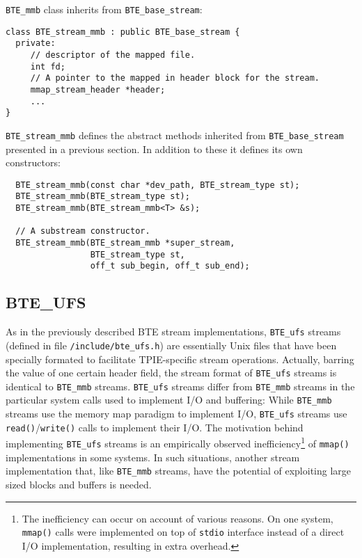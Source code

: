 \verb|BTE_mmb| class inherits from \verb|BTE_base_stream|:
\begin{verbatim}
class BTE_stream_mmb : public BTE_base_stream {
  private:
     // descriptor of the mapped file.  
     int fd;   
     // A pointer to the mapped in header block for the stream. 
     mmap_stream_header *header;
     ...
}  
\end{verbatim}

\verb|BTE_stream_mmb| defines the abstract methods inherited from
\verb|BTE_base_stream| presented in a previous section. In addition to these it defines its own
constructors:
\begin{verbatim}
  BTE_stream_mmb(const char *dev_path, BTE_stream_type st); 
  BTE_stream_mmb(BTE_stream_type st); 
  BTE_stream_mmb(BTE_stream_mmb<T> &s); 
  
  // A substream constructor.
  BTE_stream_mmb(BTE_stream_mmb *super_stream,
                 BTE_stream_type st,
                 off_t sub_begin, off_t sub_end);
\end{verbatim}

\subsection{BTE\_UFS}

\tobeextended

As in the previously described BTE stream implementations, \verb|BTE_ufs|
streams (defined in file \verb|/include/bte_ufs.h|) are essentially Unix
files that have been specially formated to facilitate TPIE-specific stream
operations. Actually, barring the value of one certain header field, the
stream format of \verb|BTE_ufs| streams is identical to \verb|BTE_mmb|
streams. \verb|BTE_ufs| streams differ from \verb|BTE_mmb| streams in the
particular system calls used to implement I/O and buffering: While
\verb|BTE_mmb| streams use the memory map paradigm to implement I/O,
\verb|BTE_ufs| streams use \verb|read()|/\verb|write()| calls to implement
their I/O. The motivation behind implementing \verb|BTE_ufs| streams is an
empirically observed inefficiency\footnote{The inefficiency can occur on
account of various reasons. On one system, \verb|mmap()| calls were
implemented on top of \verb|stdio| interface instead of a direct I/O
implementation, resulting in extra overhead.} of \verb|mmap()|
implementations in some systems. In such
situations, another stream implementation that, like \verb|BTE_mmb|
streams, have the potential of exploiting large sized blocks and buffers is
needed.

